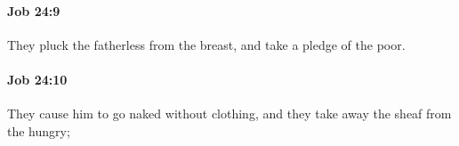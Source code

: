 		\paragraph{Job 24:9} %
			\label{JOB-24-9}

			They pluck the fatherless from the breast, and take a pledge of the poor.


		\paragraph{Job 24:10} %
			\label{JOB-24-10}

			They cause him to go naked without clothing, and they take away the sheaf from the hungry;


